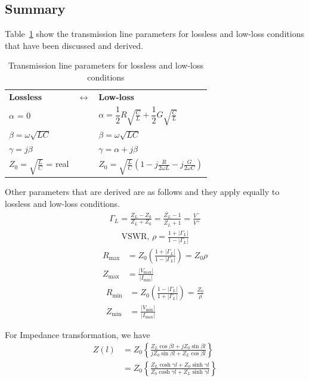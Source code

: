 \subsection*{Summary}
Table~\ref{tab:transparams} show the transmission line parameters for lossless and low-loss conditions that have been discussed and derived.
\begin{table}[h]
\caption[short]{Transmission line parameters for lossless and low-loss conditions}
\label{tab:transparams}
\begin{tabular}{l c l}
{\bf Lossless}&   	$\leftrightarrow$  & {\bf Low-loss}  \\ 
$\alpha$ = 0 &  & $\alpha = \dfrac{1}{2}R\sqrt{\frac{C}{L}} + \dfrac{1}{2}G\sqrt{\frac{C}{L}}$\\
$\beta = \omega\sqrt{LC}$ & & $\beta = \omega\sqrt{LC}$\\
$\gamma = j\beta$ & & $\gamma = \alpha + j\beta$\\
$Z_0 = \sqrt{\frac{L}{C}}$ = real &  & 	$Z_0 = \sqrt{\frac{L}{C}}\left(1 - j\frac{R}{2\omega L} - j\frac{G}{2\omega C}\right)$
\end{tabular} 
\end{table} 

Other parameters that are derived are as follows and they apply equally to lossless and low-loss conditions.
\begin{align*}
\Gamma_L = \frac{Z_L - Z_0}{Z_L + Z_0} = \frac{\bar{Z_L} - 1}{\bar{Z_L} + 1} = \frac{V^-}{V^+}
\end{align*}
\begin{align*}
\text{VSWR, }\rho = \frac{1 + |\Gamma_L|}{1 - |\Gamma_L|}
\end{align*}
\begin{align*}
R_\max &= Z_0 \left( \frac{1 + |\Gamma_L|}{1 - |\Gamma_L|}\right) = Z_0 \rho\\
Z_\max &= \frac{|V_\max|}{|I_\min|}
\end{align*}
\begin{align*}
R_\min &= Z_0 \left(\frac{1 - |\Gamma_L|}{1 + |\Gamma_L|}\right) = \frac{Z_0}{\rho}\\
Z_\min &= \frac{|V_\min|}{|I_\max|}
\end{align*}

For Impedance transformation, we have
\begin{align*}
Z(l) &= Z_0\left\lbrace\frac{Z_L\cos\beta l + jZ_0\sin\beta l}{jZ_0\sin\beta l + Z_L\cos\beta l}\right\rbrace\\ 
&= Z_0\left\lbrace\frac{Z_L\cosh\gamma l + Z_0\sinh\gamma l}{Z_0\cosh\gamma l + Z_L\sinh\gamma l}\right\rbrace
\end{align*}

